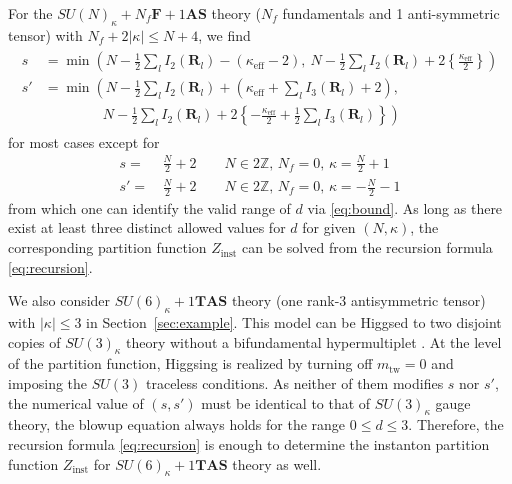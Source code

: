 \documentclass[letterpaper, 11pt]{article}
\newcommand{\nn}{\nonumber}
\def\k{\kappa}
\begin{document}
{For the $SU(N)_\kappa + N_f\mathbf{F} + 1\mathbf{AS}$ theory ($N_f$ fundamentals and 1 anti-symmetric tensor) with $N_f + 2|\kappa| \leq N+4$, we find
\begin{align}
  \label{eq:sun-nf-na}
  \begin{split}
  s &= \min  
  \left(N - \frac{1}{2} \sum_{l}I_2(\mathbf{R}_l) - (\k_\text{eff}-2),\ N - \frac{1}{2} \sum_{l}I_2(\mathbf{R}_l) + 2 \left\{\frac{\k_\text{eff}}{2}\right\}\right) \\
  s' &= \min  
  \left(N - \frac{1}{2} \sum_{l}I_2(\mathbf{R}_l) + \left(\k_\text{eff}+\sum_{l}I_3(\mathbf{R}_l)+2\right),\right. \\& \left. \qquad \qquad \  N - \frac{1}{2} \sum_{l}I_2(\mathbf{R}_l) + 2\left\{-\frac{\k_\text{eff}}{2}+\frac{1}{2}\sum_{l}I_3(\mathbf{R}_l) \right\}\right)
  \end{split} 
\end{align} for most cases except for
\begin{align}
s=&\,\frac{N}{2}+2 \qquad N\in2\mathbb{Z},\,N_f=0,\,\kappa=\frac{N}{2}+1\nn\\
s'=&\,\frac{N}{2}+2 \qquad N\in2\mathbb{Z},\,N_f=0,\,\kappa=-\frac{N}{2}-1
\end{align}
from which one can identify the valid range of $d$ via \eqref{eq:bound}. 
As long as there exist at least three distinct allowed values for $d$ for given $(N, \kappa)$, the corresponding partition function $Z_{\text{inst}}$ can be solved from the recursion formula \eqref{eq:recursion}. 

We also consider $SU(6)_\kappa  + 1 \mathbf{TAS}$ theory (one rank-3 antisymmetric tensor) with $|\kappa| \leq 3$ in Section~\ref{sec:example}. This model can be Higgsed to two disjoint copies of $SU(3)_\kappa$ theory without a bifundamental hypermultiplet \cite{Hayashi:2019yxj}. At the level of the partition function, Higgsing is realized by turning off $m_\text{tw} = 0$ and imposing the $SU(3)$ traceless conditions. As neither of them modifies $s$ nor $s'$, the numerical value of $(s,s')$ must be identical to that of $SU(3)_\kappa$ gauge theory, the blowup equation always holds for the range $0\leq d \leq 3$. Therefore, the recursion formula \eqref{eq:recursion} is enough to determine the instanton partition function $Z_{\text{inst}}$ for $SU(6)_\kappa  + 1 \mathbf{TAS}$ theory as well.


}
\end{document}
